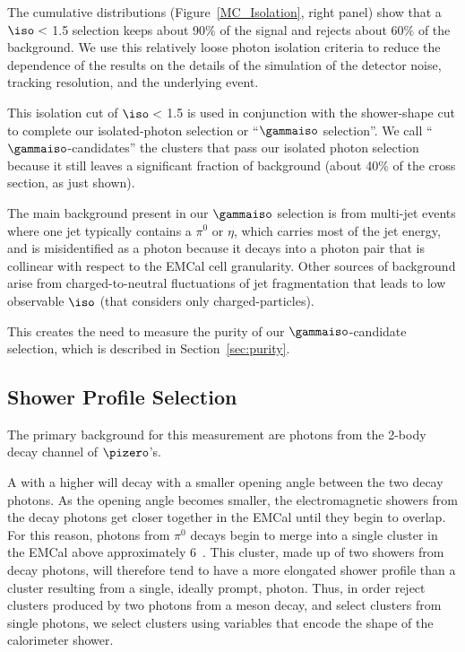 
The cumulative distributions (Figure~\ref{MC_Isolation}, right panel) show that a {$\iso<$ 1.5 \GeVc} selection keeps about 90$\%$ of the signal and rejects about 60$\%$ of the background. We use this relatively loose photon isolation criteria to reduce the dependence of the results on the details of the simulation of the detector noise, tracking resolution, and the underlying event. 


This isolation cut of {$\iso<$ 1.5 \GeVc} is used in conjunction with the shower-shape cut to complete our isolated-photon selection or ``$\gammaiso$ selection''. We call ``$\gammaiso$-candidates'' the clusters that pass our isolated photon selection because it still leaves a significant fraction of background (about 40$\%$ of the cross section, as just shown). 

The main background present in our $\gammaiso$ selection is from multi-jet events where one jet typically contains a $\pi^{0}$ or $\eta$, which carries most of the jet energy, and is misidentified  as a photon because it decays into a photon pair that is collinear with respect to the EMCal cell granularity. Other sources of background arise from charged-to-neutral fluctuations of jet fragmentation that leads to low observable $\iso$ (that considers only charged-particles). 

This creates the need to measure the purity of our $\gammaiso$-candidate selection, which is described in Section~\ref{sec:purity}. 


\subsection{Shower Profile Selection}

The primary background for this measurement are photons from the 2-body decay channel of $\pizero$'s.

A \pizero with a higher \pt will decay  with a smaller opening angle between the two decay photons. As the opening angle becomes smaller, the electromagnetic showers from the decay photons get closer together in the EMCal until they begin to overlap. For this reason, photons from $\pi^0$ decays begin to merge into a single cluster in the EMCal above approximately 6~\GeVc. This cluster, made up of two showers from decay photons, will therefore tend to have a more elongated shower profile than a cluster resulting from a single, ideally prompt, photon. Thus, in order reject clusters produced by two photons from a meson decay, and select clusters from single photons, we select clusters using variables that encode the shape of the calorimeter shower. 

